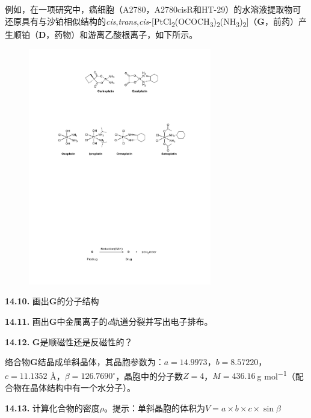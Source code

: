 例如，在一项研究中，癌细胞（A2780，A2780cisR和HT-29）的水溶液提取物可还原具有与沙铂相似结构的\textit{cis},\textit{trans},\textit{cis}-[PtCl\textsubscript{2}(OCOCH\textsubscript{3})\textsubscript{2}(NH\textsubscript{3})\textsubscript{2}]（\textbf{G}，前药）产生顺铂（\textbf{D}，药物）和游离乙酸根离子，如下所示。

\begin{figure}[h]
	\centering
	\includegraphics[width=8cm]{./pic/t14-6.pdf}
\end{figure}

\noindent\textbf{14.10.} 画出\textbf{G}的分子结构

\noindent\textbf{14.11.} 画出\textbf{G}中金属离子的\textit{d}轨道分裂并写出电子排布。

\noindent\textbf{14.12.} \textbf{G}是顺磁性还是反磁性的？

络合物\textbf{G}结晶成单斜晶体，其晶胞参数为：$a=14.9973$，$b=8.57220$，$c=11.1352$ \AA，$\beta=126.7690^{\circ} $，晶胞中的分子数$Z=4$，$M=436.16\ $g mol\textsuperscript{−1}（配合物在晶体结构中有一个水分子）。

\noindent\textbf{14.13.} 计算化合物的密度$\rho$。提示：单斜晶胞的体积为$V=a\times b\times c\times \sin\beta$

